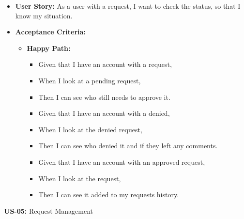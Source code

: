 \documentclass[11pt,a4paper]{article}
\begin{document}
\begin{itemize}
\item
  \textbf{User Story:} As a user with a request, I want to check the
  status, so that I know my situation.
\item
  \textbf{Acceptance Criteria:}

  \begin{itemize}
  \item
    \textbf{Happy Path:}

    \begin{itemize}
    \item
      Given that I have an account with a request,
    \item
      When I look at a pending request,
    \item
      Then I can see who still needs to approve it.
    \item
      Given that I have an account with a denied,
    \item
      When I look at the denied request,
    \item
      Then I can see who denied it and if they left any comments.
    \item
      Given that I have an account with an approved request,
    \item
      When I look at the request,
    \item
      Then I can see it added to my requests history.
    \end{itemize}
  \end{itemize}
\end{itemize}
\textbf{US-05:} Request Management
\end{document}
